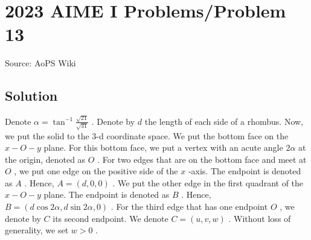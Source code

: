 \documentclass[12pt]{article}
\begin{document}
\section*{{2023 AIME I Problems/Problem 13}}
Source: AoPS Wiki

\subsection*{Solution}
Denote $\alpha = \tan^{-1} \frac{\sqrt{21}}{\sqrt{31}}$ .
Denote by $d$ the length of each side of a rhombus. Now, we put the solid to the 3-d coordinate space.
We put the bottom face on the $x-O-y$ plane.
For this bottom face, we put a vertex with an acute angle $2 \alpha$ at the origin, denoted as $O$ .
For two edges that are on the bottom face and meet at $O$ , we put one edge on the positive side of the $x$ -axis. The endpoint is denoted as $A$ . Hence, $A = \left( d , 0 , 0 \right)$ .
We put the other edge in the first quadrant of the $x-O-y$ plane. The endpoint is denoted as $B$ . Hence, $B = \left( d \cos 2 \alpha , d \sin 2 \alpha , 0 \right)$ . For the third edge that has one endpoint $O$ , we denote by $C$ its second endpoint.
We denote $C = \left( u , v , w \right)$ .
Without loss of generality, we set $w > 0$ .
\end{document}
